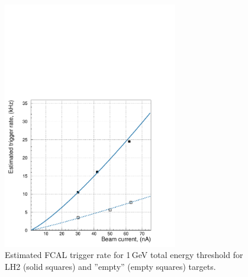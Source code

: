 \begin{figure}[tph]
\centering
\includegraphics[width=3in]{figures/fcalrate_vs_beam.pdf}
\caption{Estimated FCAL trigger rate for 1$\,$GeV
total energy threshold for LH2 (solid squares) and ''empty'' (empty squares) targets.
\label{fig:fcalrate}}
\end{figure}






